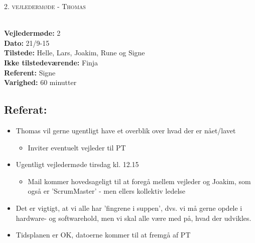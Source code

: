 \documentclass[a4paper,11pt,oneside]{memoir}
\begin{document}
\newpage


\begin{center} 
\huge{\textsc{2. vejledermøde - Thomas}}
\end{center}

\textbf{ }
\\
\textbf{Vejledermøde:} 2
\\
\textbf{Dato:} 21/9-15
\\
\textbf{Tilstede:} Helle, Lars, Joakim, Rune og Signe 
\\
\textbf{Ikke tilstedeværende:} Finja
\\
\textbf{Referent:} Signe
\\
\textbf{Varighed:} 60 minutter
\\

\subsection{Referat:}
\begin{itemize}
\item Thomas vil gerne ugentligt have et overblik over hvad der er nået/lavet
\begin{itemize}
\item Inviter eventuelt vejleder til PT
\end{itemize}
\item Ugentligt vejledermøde tirsdag kl. 12.15
\begin{itemize}
\item Mail kommer hovedsageligt til at foregå mellem vejleder og Joakim, som også er 'ScrumMaster' - men ellers kollektiv ledelse 
\end{itemize} 
\item Det er vigtigt, at vi alle har 'fingrene i suppen', dvs. vi må gerne opdele i hardware- og softwarehold, men vi skal alle være med på, hvad der udvikles.
\item Tidsplanen er OK, datoerne kommer til at fremgå af PT
\\
\end{itemize}
\end{document}
